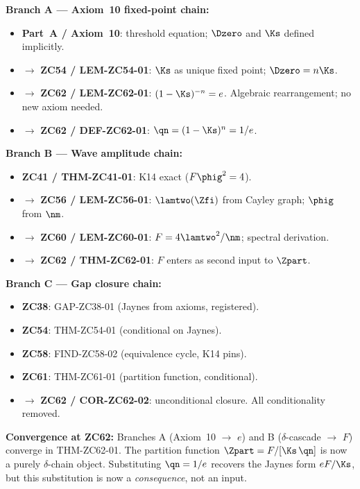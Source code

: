 \documentclass[12pt, a4paper]{article}
\begin{document}
\begin{genealogybox}[title={How ZC62's Key Objects Trace Back}]

\textbf{Branch A --- Axiom~10 fixed-point chain:}
\begin{itemize}[leftmargin=2em, noitemsep]
  \item \textbf{Part~A / Axiom~10}: threshold equation;
    $\Dzero$ and $\Ks$ defined implicitly.
  \item $\to$ \textbf{ZC54 / LEM-ZC54-01}: $\Ks$ as unique
    fixed point; $\Dzero = n\Ks$.
  \item $\to$ \textbf{ZC62 / LEM-ZC62-01}: $(1-\Ks)^{-n} = e$.
    Algebraic rearrangement; no new axiom needed.
  \item $\to$ \textbf{ZC62 / DEF-ZC62-01}: $\qn = (1-\Ks)^n = 1/e$.
\end{itemize}

\textbf{Branch B --- Wave amplitude chain:}
\begin{itemize}[leftmargin=2em, noitemsep]
  \item \textbf{ZC41 / THM-ZC41-01}: K14 exact ($F\phig^2=4$).
  \item $\to$ \textbf{ZC56 / LEM-ZC56-01}: $\lamtwo(\Zfi)$ from
    Cayley graph; $\phig$ from $\nm$.
  \item $\to$ \textbf{ZC60 / LEM-ZC60-01}: $F = 4\lamtwo^2/\nm$;
    spectral derivation.
  \item $\to$ \textbf{ZC62 / THM-ZC62-01}: $F$ enters as second
    input to $\Zpart$.
\end{itemize}

\textbf{Branch C --- Gap closure chain:}
\begin{itemize}[leftmargin=2em, noitemsep]
  \item \textbf{ZC38}: GAP-ZC38-01 (Jaynes from axioms, registered).
  \item \textbf{ZC54}: THM-ZC54-01 (conditional on Jaynes).
  \item \textbf{ZC58}: FIND-ZC58-02 (equivalence cycle, K14 pins).
  \item \textbf{ZC61}: THM-ZC61-01 (partition function, conditional).
  \item $\to$ \textbf{ZC62 / COR-ZC62-02}: unconditional closure.
    All conditionality removed.
\end{itemize}

\textbf{Convergence at ZC62:}
Branches A (Axiom~10 $\to$ $e$) and B ($\delta$-cascade $\to$ $F$)
converge in THM-ZC62-01.
The partition function $\Zpart = F/[\Ks\,\qn]$ is now a
purely $\delta$-chain object.
Substituting $\qn = 1/e$ recovers the Jaynes form $eF/\Ks$,
but this substitution is now a \emph{consequence}, not an input.
\end{genealogybox}
\end{document}
